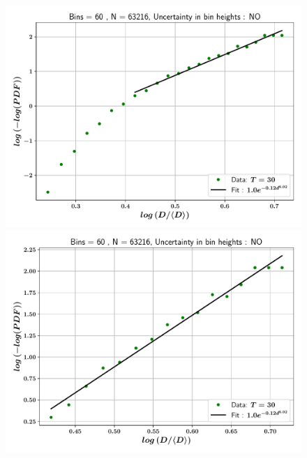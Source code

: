 \begin{figure}
\centering
\includegraphics{plots/drop_stats/log_tail_fit_uncertainty_no.pdf} \\
\includegraphics{plots/drop_stats/log_zoom_tail_fit_uncertainty_no.pdf} \\ 
\caption{\blindtext}
\label{log_fits_wo}
\end{figure}




